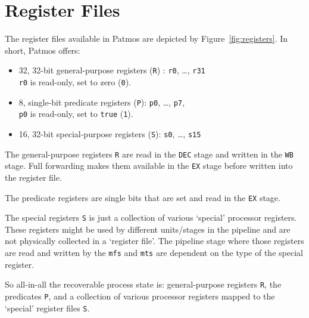 \documentclass[a4paper,fontsize=10pt,twoside,DIV15,BCOR12mm,headinclude=true,footinclude=false,pagesize,bibtotoc]{scrbook}
\newcommand{\code}[1]{{\texttt{#1}}}
\newcommand{\comment}[3]{

\textsf{\textbf{#1}} {\color{#3}#2}}
\newcommand{\martin}[1]{\comment{Martin}{#1}{Blue}}
\newcommand{\stefan}[1]{\comment{Stefan}{#1}{RoyalPurple}}
\renewcommand{\martin}[1]{}
\renewcommand{\stefan}[1]{}
\begin{document}



\section{Register Files}

The register files available in Patmos are depicted by
Figure~\ref{fig:registers}. In short, Patmos offers:
\begin{itemize}
  \item 32, 32-bit general-purpose registers (\texttt{R}) : \texttt{r0}, \dots, \texttt{r31} \\
    \texttt{r0} is read-only, set to zero (\texttt{0}).
  \item 8, single-bit predicate registers (\texttt{P}): \texttt{p0}, \dots, \texttt{p7}, \\
    \texttt{p0} is read-only, set to \texttt{true} (\texttt{1}).
  \item 16, 32-bit special-purpose registers (\texttt{S}): \texttt{s0}, \dots, \texttt{s15}
\end{itemize}

The general-purpose registers \texttt{R} are read in the \code{DEC} stage
and written in the \code{WB} stage. Full forwarding makes them available
in the \code{EX} stage before written into the register file.

The predicate registers are single bits that are set and read in the \code{EX}
stage.

The special registers \code{S} is just a collection of various `special'
processor registers. These registers might be used by different units/stages
in the pipeline and are not physically collected in a `register file'.
The pipeline stage where those registers are read and written by the
\code{mfs} and \code{mts} are dependent on the type of the special
register.

\martin{The three `register' files shall constitute the state of the processor.
Every non-obvious register, such as method base, shall be mapped to a
`special' register. Even the current PC on an interrupt shall end up in a
register that is mapped into the special register domain.}

\stefan{Umm .. it would be really good to define somewhere in which stages which special register is actually read or written by mfs/mts
;).}

So all-in-all the recoverable process state is: general-purpose registers
\code{R}, the predicates \code{P}, and a collection of various processor
registers mapped to the `special' register files \code{S}.
\end{document}

